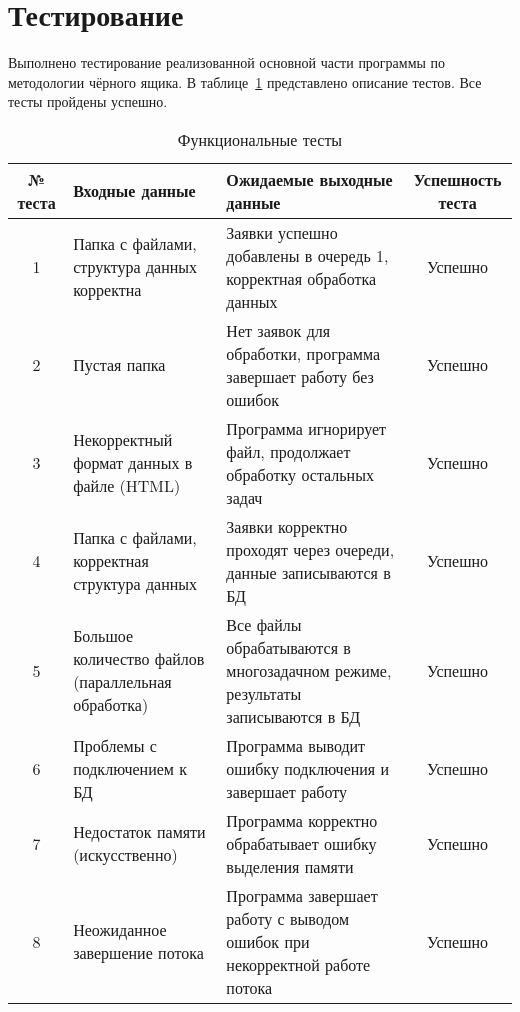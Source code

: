 \section{Тестирование}

\hspace{1.25cm}
Выполнено тестирование реализованной основной части программы по методологии чёрного ящика. В таблице~\ref{tab:tests} представлено описание тестов. Все тесты пройдены успешно.

\begin{table}[h!]
    \centering
    \caption{Функциональные тесты}
    \label{tab:tests}
    \begin{tabularx}{\textwidth}{|c|X|X|c|}
        \hline
        № теста & Входные данные                                  & Ожидаемые выходные данные                                                  & Успешность теста \\ \hline
        1       & Папка с файлами, структура данных корректна    & Заявки успешно добавлены в очередь 1, корректная обработка данных           & Успешно    \\ \hline
        2       & Пустая папка                                    & Нет заявок для обработки, программа завершает работу без ошибок           & Успешно    \\ \hline
        3       & Некорректный формат данных в файле (HTML)        & Программа игнорирует файл, продолжает обработку остальных задач           & Успешно    \\ \hline
        4       & Папка с файлами, корректная структура данных   & Заявки корректно проходят через очереди, данные записываются в БД         & Успешно    \\ \hline
        5       & Большое количество файлов (параллельная обработка) & Все файлы обрабатываются в многозадачном режиме, результаты записываются в БД  & Успешно    \\ \hline
        6       & Проблемы с подключением к БД                    & Программа выводит ошибку подключения и завершает работу                    & Успешно    \\ \hline
        7       & Недостаток памяти (искусственно)                & Программа корректно обрабатывает ошибку выделения памяти                   & Успешно    \\ \hline
        8       & Неожиданное завершение потока                    & Программа завершает работу с выводом ошибок при некорректной работе потока  & Успешно    \\ \hline
    \end{tabularx}
\end{table}
